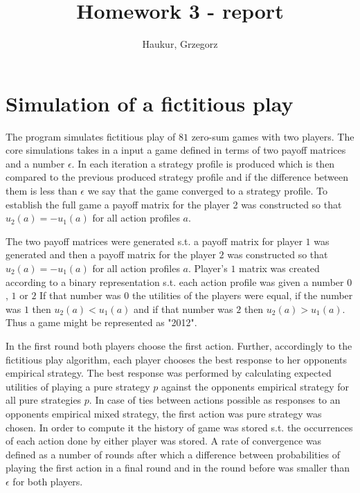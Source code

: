\documentclass{article}
\title{Homework 3 - report}
\author{Haukur, Grzegorz}
\begin{document}
\maketitle
\section{Simulation of a fictitious play}
The program simulates fictitious play of $81$ zero-sum games with two players. The core simulations takes in a input a game defined in terms of two payoff matrices and a number $\epsilon$. In each iteration a strategy profile is produced which is then compared to the previous produced strategy profile and if the difference between them is less than $\epsilon$ we say that the game converged to a strategy profile. To establish the full game a payoff matrix for the player 2 was constructed so that $u_2(a) = - u_1(a)$ for all action profiles $a$.

The two payoff matrices were generated s.t. a payoff matrix for player $1$ was generated and then a payoff matrix for the player $2$ was constructed so that $u_2(a) = - u_1(a)$ for all action profiles $a$. Player's $1$ matrix was created according to a binary representation s.t. each action profile was given a number $0$, $1$ or $2$ If that number was $0$ the utilities of the players were equal, if the number was $1$ then $u_2(a) < u_1(a)$ and if that number was $2$ then $u_2(a) > u_1(a)$. Thus a game might be represented as "2012".

In the first round both players choose the first action. Further, accordingly to the fictitious play algorithm, each player chooses the best response to her opponents empirical strategy. The best response was performed by calculating expected utilities of playing a pure strategy $p$ against the opponents empirical strategy for all pure strategies $p$. In case of ties between actions possible as responses to an opponents empirical mixed strategy, the first action was pure strategy was chosen.   In order to compute it the history of game was stored s.t. the occurrences of each action done by either player was stored.  A rate of convergence was defined as a number of rounds after which a difference between probabilities of playing the first action in a final round and in the round before was smaller than $\epsilon$ for both players.
\end{document}
